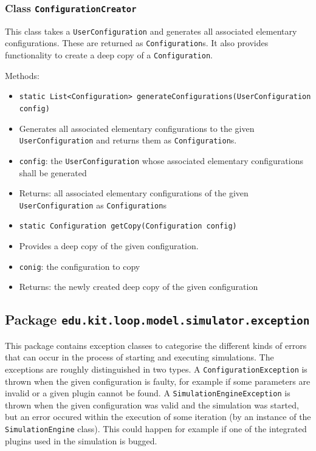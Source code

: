 \documentclass[parskip=full,11pt]{scrartcl}
\begin{document}
\subsubsection{Class \texttt{ConfigurationCreator}}
This class takes a \texttt{UserConfiguration} and generates all associated elementary configurations. These are returned as \texttt{Configuration}s. It also provides functionality to create a deep copy of a \texttt{Configuration}.

Methods:
\begin{itemize}\itemsep -10pt
\item \texttt{static List<Configuration> generateConfigurations(UserConfiguration config)}
\item[] Generates all associated elementary configurations to the given \texttt{UserConfiguration} and returns them as \texttt{Configuration}s.
\item[] \texttt{config}: the \texttt{UserConfiguration} whose associated elementary configurations shall be generated
\item[] Returns: all associated elementary configurations of the given \texttt{UserConfiguration} as \texttt{Configuration}s

\item \texttt{static Configuration getCopy(Configuration config)}
\item[] Provides a deep copy of the given configuration.
\item[] \texttt{conig}: the configuration to copy
\item[] Returns: the newly created deep copy of the given configuration
\end{itemize}

\subsection{Package \texttt{edu.kit.loop.model.simulator.exception}}
This package contains exception classes to categorise the different kinds of errors that can occur in the process of starting and executing simulations. The exceptions are roughly distinguished in two types. A \texttt{ConfigurationException} is thrown when the given configuration is faulty, for example if some parameters are invalid or a given plugin cannot be found. A \texttt{SimulationEngineException} is thrown when the given configuration was valid and the simulation was started, but an error occured within the execution of some iteration (by an instance of the \texttt{SimulationEngine} class). This could happen for example if one of the integrated plugins used in the simulation is bugged.
\end{document}
